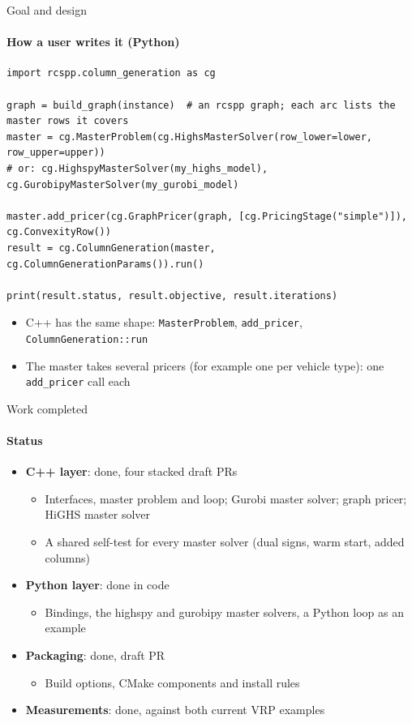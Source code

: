 \documentclass[aspectratio=169]{beamer}
\begin{document}
\begin{frame}[fragile]{Goal and design}
  \framesubtitle{How a user writes it (Python)}

\begin{lstlisting}
import rcspp.column_generation as cg

graph = build_graph(instance)  # an rcspp graph; each arc lists the master rows it covers
master = cg.MasterProblem(cg.HighsMasterSolver(row_lower=lower, row_upper=upper))
# or: cg.HighspyMasterSolver(my_highs_model), cg.GurobipyMasterSolver(my_gurobi_model)

master.add_pricer(cg.GraphPricer(graph, [cg.PricingStage("simple")]), cg.ConvexityRow())
result = cg.ColumnGeneration(master, cg.ColumnGenerationParams()).run()

print(result.status, result.objective, result.iterations)
\end{lstlisting}

  \begin{itemize}
    \item C++ has the same shape: \texttt{MasterProblem}, \texttt{add\_pricer}, \texttt{ColumnGeneration::run}
    \item The master takes several pricers (for example one per vehicle type): one \texttt{add\_pricer} call each
  \end{itemize}
\end{frame}

\begin{frame}{Work completed}
  \framesubtitle{Status}

  \begin{itemize}
    \item \textbf{C++ layer}: done, four stacked draft PRs
      \begin{itemize}
        \item Interfaces, master problem and loop; Gurobi master solver; graph pricer; HiGHS master solver
        \item A shared self-test for every master solver (dual signs, warm start, added columns)
      \end{itemize}
    \item \textbf{Python layer}: done in code
      \begin{itemize}
        \item Bindings, the highspy and gurobipy master solvers, a Python loop as an example
      \end{itemize}
    \item \textbf{Packaging}: done, draft PR
      \begin{itemize}
        \item Build options, CMake components and install rules
      \end{itemize}
    \item \textbf{Measurements}: done, against both current VRP examples
  \end{itemize}
\end{frame}
\end{document}
